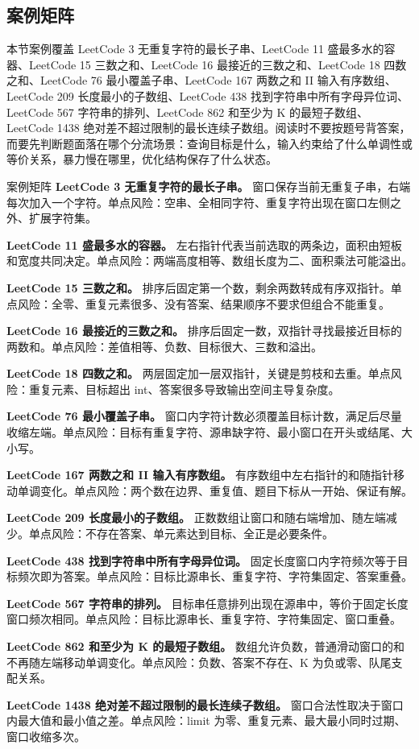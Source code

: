 \subsection{案例矩阵}

本节案例覆盖 LeetCode 3 无重复字符的最长子串、LeetCode 11 盛最多水的容器、LeetCode 15 三数之和、LeetCode 16 最接近的三数之和、LeetCode 18 四数之和、LeetCode 76 最小覆盖子串、LeetCode 167 两数之和 II 输入有序数组、LeetCode 209 长度最小的子数组、LeetCode 438 找到字符串中所有字母异位词、LeetCode 567 字符串的排列、LeetCode 862 和至少为 K 的最短子数组、LeetCode 1438 绝对差不超过限制的最长连续子数组。阅读时不要按题号背答案，而要先判断题面落在哪个分流场景：查询目标是什么，输入约束给了什么单调性或等价关系，暴力慢在哪里，优化结构保存了什么状态。

\begin{principlebox}{案例矩阵}
\textbf{LeetCode 3 无重复字符的最长子串。}
窗口保存当前无重复子串，右端每次加入一个字符。单点风险：空串、全相同字符、重复字符出现在窗口左侧之外、扩展字符集。

\textbf{LeetCode 11 盛最多水的容器。}
左右指针代表当前选取的两条边，面积由短板和宽度共同决定。单点风险：两端高度相等、数组长度为二、面积乘法可能溢出。

\textbf{LeetCode 15 三数之和。}
排序后固定第一个数，剩余两数转成有序双指针。单点风险：全零、重复元素很多、没有答案、结果顺序不要求但组合不能重复。

\textbf{LeetCode 16 最接近的三数之和。}
排序后固定一数，双指针寻找最接近目标的两数和。单点风险：差值相等、负数、目标很大、三数和溢出。

\textbf{LeetCode 18 四数之和。}
两层固定加一层双指针，关键是剪枝和去重。单点风险：重复元素、目标超出 int、答案很多导致输出空间主导复杂度。

\textbf{LeetCode 76 最小覆盖子串。}
窗口内字符计数必须覆盖目标计数，满足后尽量收缩左端。单点风险：目标有重复字符、源串缺字符、最小窗口在开头或结尾、大小写。

\textbf{LeetCode 167 两数之和 II 输入有序数组。}
有序数组中左右指针的和随指针移动单调变化。单点风险：两个数在边界、重复值、题目下标从一开始、保证有解。

\textbf{LeetCode 209 长度最小的子数组。}
正数数组让窗口和随右端增加、随左端减少。单点风险：不存在答案、单元素达到目标、全正是必要条件。

\textbf{LeetCode 438 找到字符串中所有字母异位词。}
固定长度窗口内字符频次等于目标频次即为答案。单点风险：目标比源串长、重复字符、字符集固定、答案重叠。

\textbf{LeetCode 567 字符串的排列。}
目标串任意排列出现在源串中，等价于固定长度窗口频次相同。单点风险：目标比源串长、重复字符、字符集固定、窗口重叠。

\textbf{LeetCode 862 和至少为 K 的最短子数组。}
数组允许负数，普通滑动窗口的和不再随左端移动单调变化。单点风险：负数、答案不存在、K 为负或零、队尾支配关系。

\textbf{LeetCode 1438 绝对差不超过限制的最长连续子数组。}
窗口合法性取决于窗口内最大值和最小值之差。单点风险：limit 为零、重复元素、最大最小同时过期、窗口收缩多次。

\end{principlebox}

